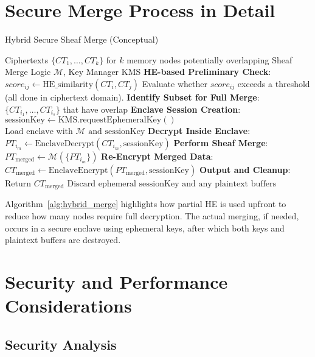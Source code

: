 \documentclass{article}
\begin{document}
\section{Secure Merge Process in Detail}

\begin{algorithm}[ht]
\caption{Hybrid Secure Sheaf Merge (Conceptual)}
\label{alg:hybrid_merge}
\begin{algorithmic}[1]
\REQUIRE Ciphertexts $\{CT_1, \dots, CT_k\}$ for $k$ memory nodes potentially overlapping
\REQUIRE Sheaf Merge Logic $\mathcal{M}$, Key Manager KMS
\STATE \textbf{HE-based Preliminary Check}:
    \STATE $score_{ij} \leftarrow \text{HE\_similarity}(CT_i, CT_j)$ 
    \STATE Evaluate whether $score_{ij}$ exceeds a threshold (all done in ciphertext domain).
  \ENDFOR
\STATE \textbf{Identify Subset for Full Merge}: $\{CT_{i_1}, \dots, CT_{i_s}\}$ that have overlap 
\STATE \textbf{Enclave Session Creation}:
  \STATE $\text{sessionKey} \leftarrow \text{KMS.requestEphemeralKey}()$
  \STATE $\text{Load enclave with }\mathcal{M}\text{ and }\text{sessionKey}$
\STATE \textbf{Decrypt Inside Enclave}:
    \STATE $PT_{i_m} \leftarrow \text{EnclaveDecrypt}(CT_{i_m}, \text{sessionKey})$
  \ENDFOR
\STATE \textbf{Perform Sheaf Merge}:
  \STATE $PT_{\mathrm{merged}} \leftarrow \mathcal{M}(\{PT_{i_m}\})$
\STATE \textbf{Re-Encrypt Merged Data}:
  \STATE $CT_{\mathrm{merged}} \leftarrow \text{EnclaveEncrypt}(PT_{\mathrm{merged}}, \text{sessionKey})$
\STATE \textbf{Output and Cleanup}:
  \STATE Return $CT_{\mathrm{merged}}$
  \STATE $\text{Discard ephemeral sessionKey and any plaintext buffers}$
\end{algorithmic}
\end{algorithm}

Algorithm~\ref{alg:hybrid_merge} highlights how partial HE is used upfront to reduce how many nodes require full decryption. The actual merging, if needed, occurs in a secure enclave using ephemeral keys, after which both keys and plaintext buffers are destroyed.

\section{Security and Performance Considerations}

\subsection{Security Analysis}
\end{document}
